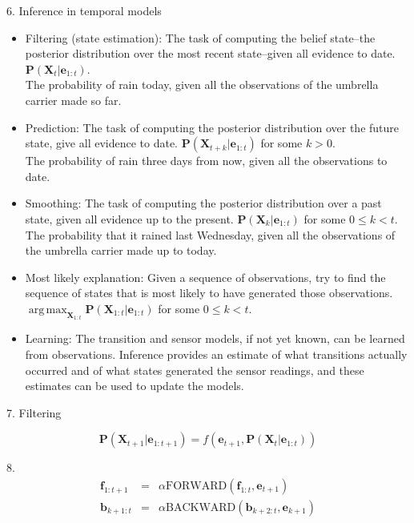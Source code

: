 \documentclass[12pt]{article}
\DeclareMathOperator*{\argmax}{arg\,max}
\begin{document}
6. Inference in temporal models
\begin{itemize}
\item Filtering (state estimation): The task of computing the belief state--the posterior distribution over the most recent state--given all evidence to date. $\boldsymbol{P}(\boldsymbol{X}_t | \boldsymbol{e}_{1:t})$. \\
The probability of rain today, given all the observations of the umbrella carrier made so far.
\item Prediction: The task of computing the posterior distribution over the future state, give all evidence to date. $\boldsymbol{P}(\boldsymbol{X}_{t+k} | \boldsymbol{e}_{1:t})$ for some $k>0$. \\
The probability of rain three days from now, given all the observations to date.
\item Smoothing: The task of computing the posterior distribution over a past state, given all evidence up to the present. $\boldsymbol{P}(\boldsymbol{X}_k | \boldsymbol{e}_{1:t})$ for some $0 \le k < t$. \\
The probability that it rained last Wednesday, given all the observations of the umbrella carrier made up to today.
\item Most likely explanation: Given a sequence of observations, try to find the sequence of states that is most likely to have generated those observations. \\
$\argmax_{\boldsymbol{X}_{1:t}}\boldsymbol{P}(\boldsymbol{X}_{1:t} | \boldsymbol{e}_{1:t})$ for some $0 \le k < t$.
\item Learning: The transition and sensor models, if not yet known, can be learned from observations. Inference provides an estimate of what transitions actually occurred and of what states generated the sensor readings, and these estimates can be used to update the models.
\end{itemize}

7. Filtering

\begin{equation*}
\boldsymbol{P}(\boldsymbol{X}_{t+1} | \boldsymbol{e}_{1:t+1})
= f(\boldsymbol{e}_{t+1}, 
    \boldsymbol{P}(\boldsymbol{X}_t | \boldsymbol{e}_{1:t}))
\end{equation*}

8.
\begin{eqnarray*}
\boldsymbol{f}_{1:t+1}
&=& \alpha \text{FORWARD}(\boldsymbol{f}_{1:t}, \boldsymbol{e}_{t+1}) \\
\boldsymbol{b}_{k+1:t}
&=& \alpha \text{BACKWARD}(\boldsymbol{b}_{k+2:t}, \boldsymbol{e}_{k+1})
\end{eqnarray*}
\end{document}
